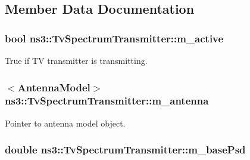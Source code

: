 \subsection{Member Data Documentation}
\subsubsection[{\texorpdfstring{m\+\_\+active}{m_active}}]{\setlength{\rightskip}{0pt plus 5cm}bool ns3\+::\+Tv\+Spectrum\+Transmitter\+::m\+\_\+active\hspace{0.3cm}{\ttfamily [private]}}\hypertarget{classns3_1_1TvSpectrumTransmitter_a474fa631e8aaa85445b0ba463b20b61b}{}\label{classns3_1_1TvSpectrumTransmitter_a474fa631e8aaa85445b0ba463b20b61b}


True if TV transmitter is transmitting. 

\subsubsection[{\texorpdfstring{m\+\_\+antenna}{m_antenna}}]{$<${\bf Antenna\+Model}$>$ ns3\+::\+Tv\+Spectrum\+Transmitter\+::m\+\_\+antenna\hspace{0.3cm}{\ttfamily [private]}}\hypertarget{classns3_1_1TvSpectrumTransmitter_a1503f457fc9047fa63f0990cdb3fe8b6}{}\label{classns3_1_1TvSpectrumTransmitter_a1503f457fc9047fa63f0990cdb3fe8b6}


Pointer to antenna model object. 

\subsubsection[{\texorpdfstring{m\+\_\+base\+Psd}{m_basePsd}}]{\setlength{\rightskip}{0pt plus 5cm}double ns3\+::\+Tv\+Spectrum\+Transmitter\+::m\+\_\+base\+Psd\hspace{0.3cm}{\ttfamily [private]}}\hypertarget{classns3_1_1TvSpectrumTransmitter_a2d1d8e8127f61ed696bee9acf2ea2de2}{}\label{classns3_1_1TvSpectrumTransmitter_a2d1d8e8127f61ed696bee9acf2ea2de2}


